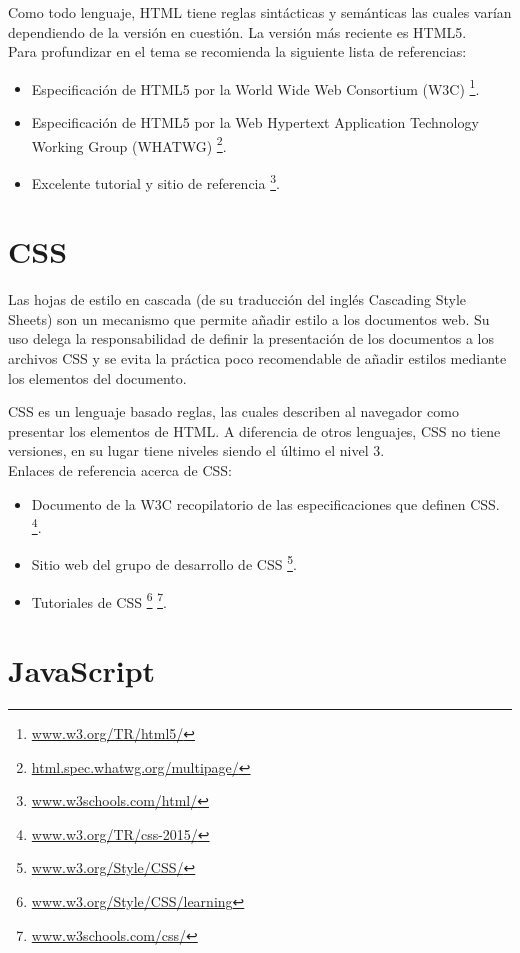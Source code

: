 \documentclass[10pt,a4paper]{report}
\begin{document}
Como todo lenguaje, HTML tiene reglas sintácticas y semánticas las cuales varían dependiendo de la versión en cuestión. La versión más reciente es HTML5. \\

Para profundizar en el tema se recomienda la siguiente lista de referencias:
\begin{itemize}
	\item Especificación de HTML5 por la World Wide Web Consortium (W3C)
	\footnote{\url{www.w3.org/TR/html5/}}.
	\item Especificación de HTML5 por la  Web Hypertext Application Technology Working Group (WHATWG)
	\footnote{\url{html.spec.whatwg.org/multipage/}}.
	\item Excelente tutorial y sitio de referencia
	\footnote{\url{www.w3schools.com/html/}}.
\end{itemize}


\section{CSS}

Las hojas de estilo en cascada (de su traducción del inglés Cascading Style Sheets) son un mecanismo que permite añadir estilo a los documentos web. Su uso delega la responsabilidad de definir la presentación de los documentos a los archivos CSS y se evita la práctica poco recomendable de añadir estilos mediante los elementos del documento.

CSS es un lenguaje basado reglas, las cuales describen al navegador como presentar los elementos de HTML.
A diferencia de otros lenguajes, CSS no tiene versiones, en su lugar tiene niveles siendo el último el nivel 3.\\

Enlaces de referencia acerca de CSS:
\begin{itemize}
	\item Documento de la W3C recopilatorio de las especificaciones que definen CSS.
	\footnote{\url{www.w3.org/TR/css-2015/}}.
	\item Sitio web del grupo de desarrollo de CSS
	\footnote{\url{www.w3.org/Style/CSS/}}.
	\item Tutoriales de CSS
	\footnote{\url{www.w3.org/Style/CSS/learning}}
	\footnote{\url{www.w3schools.com/css/}}.
\end{itemize}



\section{JavaScript}
\end{document}
